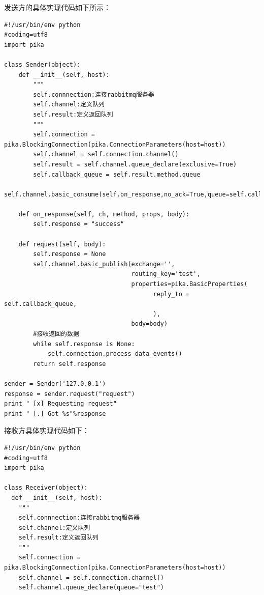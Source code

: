 发送方的具体实现代码如下所示：

\begin{verbatim} 
#!/usr/bin/env python
#coding=utf8
import pika
 
class Sender(object):
    def __init__(self, host):
        """
        self.connnection:连接rabbitmq服务器
        self.channel:定义队列
        self.result:定义返回队列
        """
        self.connection = pika.BlockingConnection(pika.ConnectionParameters(host=host))
        self.channel = self.connection.channel()
        self.result = self.channel.queue_declare(exclusive=True)
        self.callback_queue = self.result.method.queue
        self.channel.basic_consume(self.on_response,no_ack=True,queue=self.callback_queue)
 
    def on_response(self, ch, method, props, body):
        self.response = "success"

    def request(self, body):
        self.response = None
        self.channel.basic_publish(exchange='',
                                   routing_key='test',
                                   properties=pika.BasicProperties(
                                         reply_to = self.callback_queue,
                                         ),
                                   body=body)
        #接收返回的数据
        while self.response is None:
            self.connection.process_data_events()
        return self.response
 
sender = Sender('127.0.0.1')
response = sender.request("request")
print " [x] Requesting request"
print " [.] Got %s"%response

\end{verbatim}

接收方具体实现代码如下：

\begin{verbatim} 
#!/usr/bin/env python
#coding=utf8
import pika

class Receiver(object):
  def __init__(self, host):
    """
    self.connnection:连接rabbitmq服务器
    self.channel:定义队列
    self.result:定义返回队列
    """
    self.connection =  pika.BlockingConnection(pika.ConnectionParameters(host=host))
    self.channel = self.connection.channel()
    self.channel.queue_declare(queue="test")
\end{verbatim}

